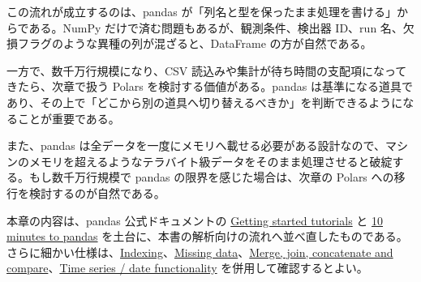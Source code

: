 この流れが成立するのは、pandas が「列名と型を保ったまま処理を書ける」からである。NumPy だけで済む問題もあるが、観測条件、検出器 ID、run 名、欠損フラグのような異種の列が混ざると、DataFrame の方が自然である。

一方で、数千万行規模になり、CSV 読込みや集計が待ち時間の支配項になってきたら、次章で扱う Polars を検討する価値がある。pandas は基準になる道具であり、その上で「どこから別の道具へ切り替えるべきか」を判断できるようになることが重要である。

また、pandas は全データを一度にメモリへ載せる必要がある設計なので、マシンのメモリを超えるようなテラバイト級データをそのまま処理させると破綻する。もし数千万行規模で pandas の限界を感じた場合は、次章の Polars への移行を検討するのが自然である。

本章の内容は、pandas 公式ドキュメントの \href{https://pandas.pydata.org/docs/getting_started/intro_tutorials/}{Getting started tutorials} と \href{https://pandas.pydata.org/pandas-docs/stable/user_guide/10min.html}{10 minutes to pandas} を土台に、本書の解析向けの流れへ並べ直したものである。さらに細かい仕様は、\href{https://pandas.pydata.org/docs/user_guide/indexing.html}{Indexing}、\href{https://pandas.pydata.org/docs/user_guide/missing_data.html}{Missing data}、\href{https://pandas.pydata.org/docs/user_guide/merging.html}{Merge, join, concatenate and compare}、\href{https://pandas.pydata.org/docs/user_guide/timeseries.html}{Time series / date functionality} を併用して確認するとよい。
